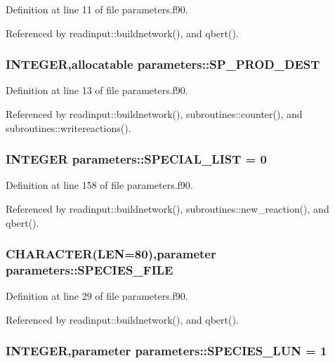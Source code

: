 Definition at line 11 of file parameters.f90.

Referenced by readinput::buildnetwork(), and qbert().\hypertarget{namespaceparameters_a649c343c05b95e3f84d06401b3a3f6e1}{
\subsubsection[{SP\_\-PROD\_\-DEST}]{\setlength{\rightskip}{0pt plus 5cm}INTEGER,allocatable {\bf parameters::SP\_\-PROD\_\-DEST}}}
\label{namespaceparameters_a649c343c05b95e3f84d06401b3a3f6e1}


Definition at line 13 of file parameters.f90.

Referenced by readinput::buildnetwork(), subroutines::counter(), and subroutines::writereactions().\hypertarget{namespaceparameters_a9a296e15d2f09049ceb473a5f0fb9e5f}{
\subsubsection[{SPECIAL\_\-LIST}]{\setlength{\rightskip}{0pt plus 5cm}INTEGER {\bf parameters::SPECIAL\_\-LIST} = 0}}
\label{namespaceparameters_a9a296e15d2f09049ceb473a5f0fb9e5f}


Definition at line 158 of file parameters.f90.

Referenced by readinput::buildnetwork(), subroutines::new\_\-reaction(), and qbert().\hypertarget{namespaceparameters_af23a39fc248303c9a69e3e05c0fb3b41}{
\subsubsection[{SPECIES\_\-FILE}]{\setlength{\rightskip}{0pt plus 5cm}CHARACTER(LEN=80),parameter {\bf parameters::SPECIES\_\-FILE}}}
\label{namespaceparameters_af23a39fc248303c9a69e3e05c0fb3b41}


Definition at line 29 of file parameters.f90.

Referenced by readinput::buildnetwork(), and qbert().\hypertarget{namespaceparameters_a209bdf781f449ab7ff2231fa1b9fa73a}{
\subsubsection[{SPECIES\_\-LUN}]{\setlength{\rightskip}{0pt plus 5cm}INTEGER,parameter {\bf parameters::SPECIES\_\-LUN} = 1}}
\label{namespaceparameters_a209bdf781f449ab7ff2231fa1b9fa73a}



